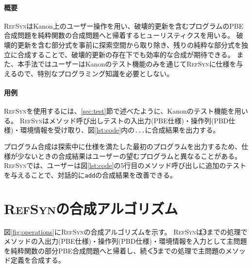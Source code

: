 \documentclass[11pt, a4paper, oneside, twocolumn]{jsarticle}
\newcommand{\mysys}{\textsc{RefSyn}}
\begin{document}
\paragraph*{概要}
\mysys{}はKanon上のユーザー操作を用い、破壊的更新を含むプログラムのPBE合成問題を純粋関数の合成問題へと帰着するヒューリスティクスを用いる。
破壊的更新を含む部分式を事前に探索空間から取り除き、残りの純粋な部分式を独立に合成することで、破壊的更新の存在下でも効率的な合成が期待できる。
また、本手法ではユーザーはKanonのテスト機能のみを通じて\mysys{}に仕様を与えるので、特別なプログラミング知識を必要としない。

\paragraph*{用例}
\mysys{}を使用するには、\ref{sec:test}節で述べたように、Kanonのテスト機能を用いる。
\mysys{}はメソッド呼び出しテストの入出力(PBE仕様)・操作列(PBD仕様)・環境情報を受け取り、図\ref{lst:code}内の\texttt{...}に合成結果を出力する。

プログラム合成は探索中に仕様を満たした最初のプログラムを出力するため、仕様が少ないときの合成結果はユーザーの望むプログラムと異なることがある。
\mysys{}では、ユーザーは図\ref{lst:code}の5行目のメソッド呼び出しに追加のテストを与えることで、対話的に\texttt{add}の合成結果を改善できる。


\section{\mysys{}の合成アルゴリズム}
図\ref{fig:operations}に\mysys{}の合成アルゴリズムを示す。
\mysys{}は\textcircled{\scriptsize 3}までの処理でメソッドの入出力(PBE仕様)・操作列(PBD仕様)・環境情報を入力として主問題を純粋関数の部分PBE合成問題へと帰着し、続く\textcircled{\scriptsize 5}までの処理で主問題のメソッド定義を合成する。
\end{document}
